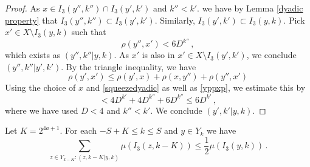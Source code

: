 \begin{proof}
As $x\in I_3(y'',k'')\cap I_3(y',k')$ and $k''< k'$.
we have by Lemma \ref{dyadic property} that
$I_3(y'',k'')\subset I_3(y',k')$. Similarly,
$I_3(y',k')\subset I_3(y,k)$.
Pick $x'\in X\setminus I_3(y,k)$ such that
\begin{equation}\label{yppxp}
    \rho(y'',x')< 6D^{k''}\, ,
\end{equation}
which exists as $(y'',k''|y,k)$. As $x'$ is also in
$x'\in X\setminus I_3(y',k')$, we conclude
$(y'',k''|y',k')$.
By the triangle inequality, we have
\begin{equation}
\rho(y',x')\le  \rho(y',x)+\rho(x,y'')+\rho(y'',x')
\end{equation}
Using the choice of $x$ and \eqref{squeezedyadic}
as well as \eqref{yppxp}, we estimate this by
\begin{equation}
<  4D^{k'}+4D^{k''}+6D^{k''}\le 6D^{k'}\, ,
\end{equation}
where we have used $D<4$ and $k''<k'$.
We conclude $(y',k'|y,k)$.
\end{proof}


\begin{lemma}\label{small boundary}
 Let $K = 2^{4a+1}$. For each $-S+K\le k\le S$ and $y\in Y_k$ we have
    \begin{equation}
        \label{new small boundary}
        \sum_{z\in Y_{k-K}: (z,k-K|y,k)}\mu(I_3(z,k-K)) \le \frac 12 \mu(I_3(y,k))\,.
    \end{equation}
\end{lemma}

